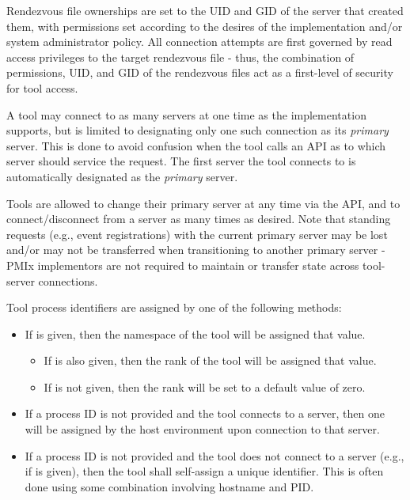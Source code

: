 Rendezvous file ownerships are set to the \ac{UID} and \ac{GID} of the server that created them, with permissions set according to the desires of the implementation and/or system administrator policy. All connection attempts are first governed by read access privileges to the target rendezvous file - thus, the combination of permissions, \ac{UID}, and \ac{GID} of the rendezvous files act as a first-level of security for tool access.

A tool may connect to as many servers at one time as the implementation supports, but is limited to designating only one such connection as its \emph{primary} server. This is done to avoid confusion when the tool calls an \ac{API} as to which server should service the request. The first server the tool connects to is automatically designated as the \emph{primary} server.

Tools are allowed to change their primary server at any time via the  \ac{API}, and to connect/disconnect from a server as many times as desired. Note that standing requests (e.g., event registrations) with the current primary server may be lost and/or may not be transferred when transitioning to another primary server - \ac{PMIx} implementors are not required to maintain or transfer state across tool-server connections.

Tool process identifiers are assigned by one of the following methods:

\begin{itemize}
    \item If  is given, then the namespace of the tool will be assigned that value.
    \begin{itemize}
        \item If  is also given, then the rank of the tool will be assigned that value.
        \item If  is not given, then the rank will be set to a default value of zero.
    \end{itemize}
    \item If a process ID is not provided and the tool connects to a server, then one will be assigned by the host environment upon connection to that server.
    \item If a process ID is not provided and the tool does not connect to a server (e.g., if  is given), then the tool shall self-assign a unique identifier. This is often done using some combination involving hostname and \ac{PID}.
\end{itemize}

